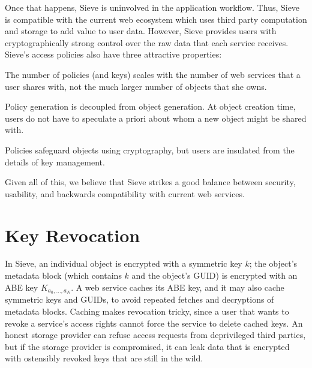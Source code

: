 Once that happens, Sieve is uninvolved in
the application workflow. Thus, Sieve is
compatible with the current web ecosystem
which uses third party computation and
storage to add value to user data. However,
Sieve provides users with cryptographically
strong control over the raw data that each
service receives. Sieve's access policies
also have three attractive properties:
  \begin{smitemize}
    \item The number of policies (and keys) scales with
          the number of web services that a user
          shares with, not the much larger number
          of objects that she owns.
    \item Policy generation is decoupled from
          object generation. At object creation
          time, users do not have to speculate
          a priori about whom a new object might
          be shared with.
    \item Policies safeguard objects using
          cryptography, but users are insulated
          from the details of key management.
  \end{smitemize}
Given all of this, we believe that Sieve
strikes a good balance between security,
usability, and backwards compatibility with
current web services.


\section{Key Revocation}
\label{sec:revocation}

In Sieve, an individual object is encrypted
with a symmetric key $k$; the object's metadata
block (which contains $k$ and the object's
GUID) is encrypted with an ABE key $K_{a_0,\ldots,a_N}$.
A web service caches its ABE key, and it may also
cache symmetric keys and GUIDs, to avoid
repeated fetches and decryptions of metadata
blocks. Caching makes revocation tricky,
since a user that wants to revoke a service's
access rights cannot force the service to delete
cached keys. An honest storage provider can
refuse access requests from deprivileged third
parties, but if the storage provider is
compromised, it can leak data that is
encrypted with ostensibly revoked keys
that are still in the wild.

